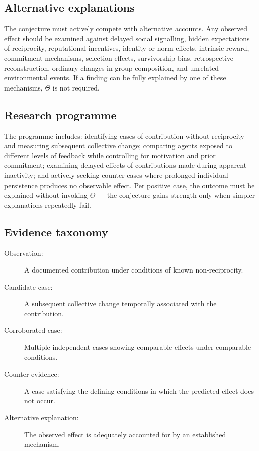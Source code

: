 \documentclass[10pt,twocolumn]{article}
\begin{document}
\subsection*{Alternative explanations}

The conjecture must actively compete with alternative accounts. Any observed effect should be examined against delayed social signalling, hidden expectations of reciprocity, reputational incentives, identity or norm effects, intrinsic reward, commitment mechanisms, selection effects, survivorship bias, retrospective reconstruction, ordinary changes in group composition, and unrelated environmental events. If a finding can be fully explained by one of these mechanisms, $\Theta$ is not required.

\subsection*{Research programme}

The programme includes: identifying cases of contribution without reciprocity and measuring subsequent collective change; comparing agents exposed to different levels of feedback while controlling for motivation and prior commitment; examining delayed effects of contributions made during apparent inactivity; and actively seeking counter-cases where prolonged individual persistence produces no observable effect. Per positive case, the outcome must be explained without invoking $\Theta$ --- the conjecture gains strength only when simpler explanations repeatedly fail.

\subsection*{Evidence taxonomy}

\begin{description}
    \item[Observation:] A documented contribution under conditions of known non-reciprocity.
    \item[Candidate case:] A subsequent collective change temporally associated with the contribution.
    \item[Corroborated case:] Multiple independent cases showing comparable effects under comparable conditions.
    \item[Counter-evidence:] A case satisfying the defining conditions in which the predicted effect does not occur.
    \item[Alternative explanation:] The observed effect is adequately accounted for by an established mechanism.
\end{description}
\end{document}
